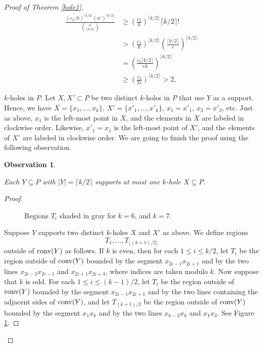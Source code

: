 \documentclass[10pt,a4paper]{amsart}
\newtheorem{observation}{Observation}
\def\conv{\mbox{\rm conv}}
\begin{document}
\begin{proof}[Proof of Theorem \ref{hole1}]
\begin{align*}
\frac{\left(c_2/k\right)^{\lceil k/2\rceil} (n')^{\lceil k/2\rceil}}
{\binom{n'}{\lceil k/2\rceil}}
&\ge
\left(\frac{c_2}{k}\right)^{\lceil k/2\rceil}\lceil k/2\rceil!\, 
\\
&>
\left(\frac{c_2}{k}\right)^{\lceil k/2\rceil}
\left(\frac{\lceil k/2\rceil}{e}\right)^{\lceil k/2\rceil}  \\
&=
\left(\frac{c_2\lceil k/2\rceil}{ek}\right)^{\lceil k/2\rceil}  \\
&\ge
\left(\frac{c_2}{2e}\right)^{\lceil k/2\rceil} 
>2,
\end{align*}

\noindent $k$-holes in $P$.  
Let $X,X' \subset P$ be two distinct $k$-holes in $P$ that use $Y$ as a support.  Hence, we have $X = \{x_1,\ldots, x_k\}$, $X' = \{x'_1,\ldots, x'_k\}$, $x_1 = x'_1$, $x_3 = x'_3$, etc. Just as above, $x_1$ is the left-most point in $X$, and the elements in $X$ are labeled in clockwise order.  Likewise, \(x'_1=x_1\) is the left-most point of \(X'\), and the elements of \(X'\) are labeled in clockwise order. We are going to finish the proof using the following observation. 


\begin{observation}\label{diff}

Each $Y\subseteq P$ with $|Y|=\lceil k/2\rceil$ supports at most one $k$-hole $X\subseteq P$.  
    
\end{observation}

\begin{proof}

    \begin{figure}
        \centering
        
        \caption{Regions $T_i$ shaded in gray for $k = 6$, and $k = 7$.}
        \label{exconv}
    \end{figure}

Suppose $Y$ supports two distinct $k$-holes $X$ and $X'$ as above. We define regions \[T_1,\ldots,T_{\lfloor (k+1)/2\rfloor}\] outside of \(\conv(Y)\) as follows. If \(k\) is even, then for each \(1\le i\le k/2\), let \(T_i\) be the region outside of \(\conv(Y)\) bounded by the segment \(x_{2i-1}x_{2i+1}\) and by the two lines \(x_{2i-3}x_{2i-1}\) and \(x_{2i+1}x_{2i+3}\), where indices are taken modulo \(k\).  Now suppose that \(k\) is odd. For each \(1\le i\le (k-1)/2\), let \(T_i\) be the region outside of \(\conv(Y)\) bounded by the segment \(x_{2i-1}x_{2i+1}\) and by the two lines containing the adjacent sides of \(\conv(Y)\), and let \(T_{(k+1)/2}\) be the region outside of \(\conv(Y)\) bounded by the segment \(x_1x_k\) and by the two lines \(x_{k-2}x_k\) and \(x_1x_3\).  See Figure \ref{exconv}.






\end{proof}
\end{proof}
\end{document}
